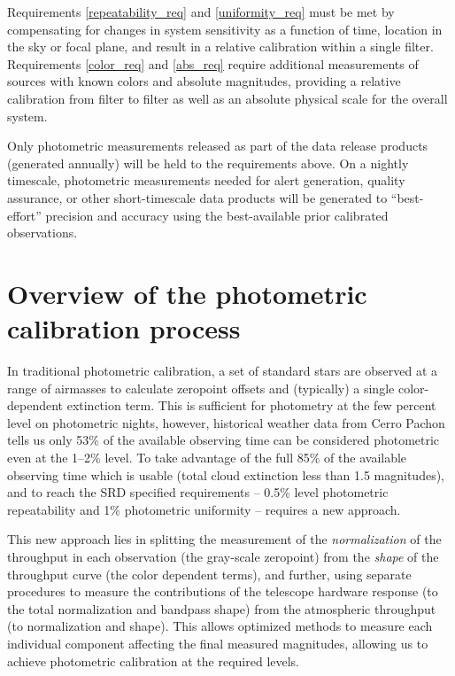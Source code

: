 \documentclass[12pt,preprint]{aastex}
\begin{document}
Requirements \ref{repeatability_req} and \ref{uniformity_req} must be
met by compensating for changes in system sensitivity as a function of
time, location in the sky or focal plane, and result in a relative
calibration within a single filter. Requirements \ref{color_req} and
\ref{abs_req} require additional measurements of sources with known
colors and absolute magnitudes, providing a relative calibration from
filter to filter as well as an absolute physical scale for the overall
system.

Only photometric measurements released as part of the data release
products (generated annually) will be held to the requirements
above. On a nightly timescale, photometric measurements needed for
alert generation, quality assurance, or other short-timescale data
products will be generated to ``best-effort'' precision and accuracy
using the best-available prior calibrated observations.

\section{Overview of the photometric calibration process}
\label{sec:calib_overview}

In traditional photometric calibration, a set of standard stars are
observed at a range of airmasses to calculate zeropoint offsets and
(typically) a single color-dependent extinction term. This is
sufficient for photometry at the few percent level on photometric
nights, however, historical weather data from Cerro Pachon tells us
only 53\% of the available observing time can be considered
photometric even at the 1--2\% level. To take advantage of the full
85\% of the available observing time which is usable (total cloud
extinction less than 1.5 magnitudes), and to reach the SRD specified
requirements -- 0.5\% level photometric repeatability and 1\%
photometric uniformity -- requires a new approach.

This new approach lies in splitting the measurement of the {\it
normalization} of the throughput in each observation (the gray-scale
zeropoint) from the {\it shape} of the throughput curve (the color
dependent terms), and further, using separate procedures to measure
the contributions of the telescope hardware response (to the total
normalization and bandpass shape) from the atmospheric throughput (to
normalization and shape). This allows optimized methods to measure
each individual component affecting the final measured magnitudes,
allowing us to achieve photometric calibration at the required levels.
\end{document}
